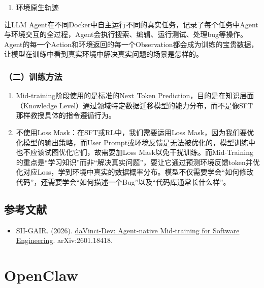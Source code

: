 \begin{enumerate}
\def\labelenumi{\arabic{enumi}.}
\setcounter{enumi}{1}
\tightlist
\item
  环境原生轨迹
\end{enumerate}

让LLM Agent在不同Docker中自主运行不同的真实任务，记录了每个任务中Agent与环境交互的全过程，Agent会执行搜索、编辑、运行测试、处理bug等操作。Agent的每一个Action和环境返回的每一个Observation都会成为训练的宝贵数据，让模型在训练中看到真实环境中解决真实问题的场景是怎样的。

\hypertarget{ux4e8cux8badux7ec3ux65b9ux6cd5}{%
\subsubsection{（二）训练方法}\label{ux4e8cux8badux7ec3ux65b9ux6cd5}}

\begin{enumerate}
\def\labelenumi{\arabic{enumi}.}
\item
  Mid-training阶段使用的是标准的Next Token Prediction，目的是在知识层面（Knowledge Level）通过领域特定数据迁移模型的能力分布，而不是像SFT那样教授具体的指令遵循行为。
\item
  不使用Loss Mask：在SFT或RL中，我们需要运用Loss Mask，因为我们要优化模型的输出策略，而User Prompt或环境反馈是无法被优化的，模型训练中也不应该试图优化它们，故需要加Loss Mask以免干扰训练。而Mid-Training的重点是``学习知识''而非``解决真实问题''，要让它通过预测环境反馈token并优化对应Loss，学到环境中真实的数据概率分布。模型不仅需要学会``如何修改代码''，还需要学会``如何描述一个Bug''以及``代码库通常长什么样''。
\end{enumerate}

\hypertarget{ux53c2ux8003ux6587ux732e-118}{%
\subsection{参考文献}\label{ux53c2ux8003ux6587ux732e-118}}

\begin{itemize}
\tightlist
\item
  SII-GAIR. (2026). \href{https://arxiv.org/abs/2601.18418}{daVinci-Dev: Agent-native Mid-training for Software Engineering}. arXiv:2601.18418.
\end{itemize}

\clearpage

\hypertarget{openclaw}{%
\section{OpenClaw}\label{openclaw}}

